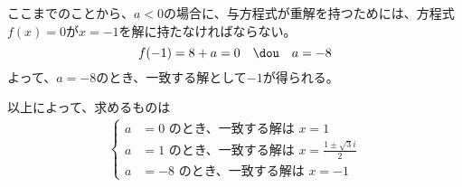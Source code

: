 ここまでのことから、$a<0$の場合に、与方程式が重解を持つためには、方程式$f(x)=0$が$x=-1$を解に持たなければならない。
\[ f(-1)=8+a=0 \quad\dou\quad a=-8 \]
よって、$a=-8$のとき、一致する解として$-1$が得られる。

以上によって、求めるものは
\begin{align*}
 \left\{
 \begin{aligned}
  a&=0\,\,\text{のとき、一致する解は}\,\, x=1 \\
  a&=1\,\,\text{のとき、一致する解は}\,\, x=\frac{1\pm\sqrt{3}i}{2} \\
  a&=-8\,\,\text{のとき、一致する解は}\,\, x=-1
 \end{aligned}
 \right.
\end{align*}